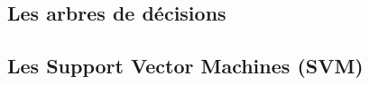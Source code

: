 \documentclass[10pt]{beamer}
\newcommand{\hsp}{\hspace*{1em}}
\begin{document}


\subsection*{Les arbres de décisions}

\subsection*{Les Support Vector Machines (SVM)}

%



%	
%	
%
%	
%	
%	
%	
%
%	
\end{document}
